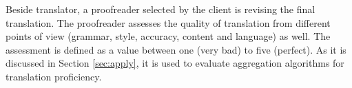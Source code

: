 Beside translator, a proofreader selected by the client is revising the final translation. The proofreader assesses the quality of translation from different points of view (grammar, style, accuracy, content and language) as well. The assessment is defined as a value between one (very bad) to five (perfect). As it is discussed in Section \ref{sec:apply}, it is used to evaluate aggregation algorithms for translation proficiency.

